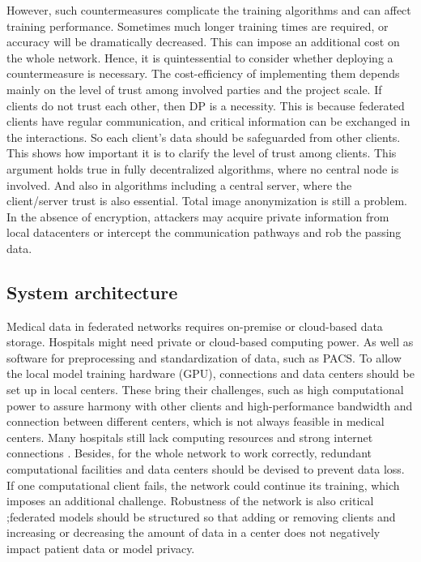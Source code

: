 However, such countermeasures complicate the training algorithms and can affect training performance. Sometimes much longer training times are required, or accuracy will be dramatically decreased. This can impose an additional cost on the whole network. Hence, it is quintessential to consider whether deploying a countermeasure is necessary. The cost-efficiency of implementing them depends mainly on the level of trust among involved parties and the project scale. If clients do not trust each other, then DP is a necessity. This is because federated clients have regular communication, and critical information can be exchanged in the interactions. So each client's data should be safeguarded from other clients. This shows how important it is to clarify the level of trust among clients. This argument holds true in fully decentralized algorithms, where no central node is involved. And also in algorithms including a central server, where the client/server trust is also essential. 
Total image anonymization is still a problem. In the absence of encryption, attackers may acquire private information from local datacenters or intercept the communication pathways and rob the passing data.


\subsection{System architecture}

Medical data in federated networks requires on-premise or cloud-based data storage. Hospitals might need private or cloud-based computing power. As well as software for preprocessing and standardization of data, such as PACS. To allow the local model training hardware (GPU), connections and data centers should be set up in local centers. These bring their challenges, such as high computational power to assure harmony with other clients and high-performance bandwidth and connection between different centers, which is not always feasible in medical centers. Many hospitals still lack computing resources and strong internet connections \cite{li2010securing}. Besides, for the whole network to work correctly, redundant computational facilities and data centers should be devised to prevent data loss. If one computational client fails, the network could continue its training, which imposes an additional challenge. Robustness of the network is also critical ;federated models should be structured so that adding or removing clients and increasing or decreasing the amount of data in a center does not negatively impact patient data or model privacy.

